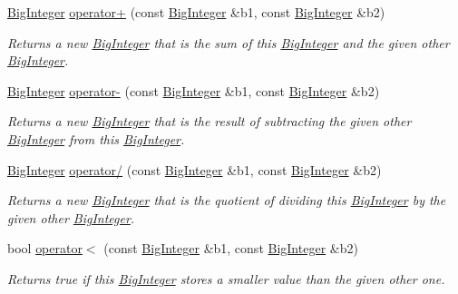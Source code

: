 \begin{DoxyCompactItemize}
\mbox{\hyperlink{classBigInteger}{Big\+Integer}} \mbox{\hyperlink{classBigInteger_a60c054a92aedb2aabf4b18d1fece1773}{operator+}} (const \mbox{\hyperlink{classBigInteger}{Big\+Integer}} \&b1, const \mbox{\hyperlink{classBigInteger}{Big\+Integer}} \&b2)
\begin{DoxyCompactList}\small\item\em Returns a new \mbox{\hyperlink{classBigInteger}{Big\+Integer}} that is the sum of this \mbox{\hyperlink{classBigInteger}{Big\+Integer}} and the given other \mbox{\hyperlink{classBigInteger}{Big\+Integer}}. \end{DoxyCompactList}\item 
\mbox{\hyperlink{classBigInteger}{Big\+Integer}} \mbox{\hyperlink{classBigInteger_ade6e91641d142240dc488b015c75504e}{operator-\/}} (const \mbox{\hyperlink{classBigInteger}{Big\+Integer}} \&b1, const \mbox{\hyperlink{classBigInteger}{Big\+Integer}} \&b2)
\begin{DoxyCompactList}\small\item\em Returns a new \mbox{\hyperlink{classBigInteger}{Big\+Integer}} that is the result of subtracting the given other \mbox{\hyperlink{classBigInteger}{Big\+Integer}} from this \mbox{\hyperlink{classBigInteger}{Big\+Integer}}. \end{DoxyCompactList}\item 
\mbox{\hyperlink{classBigInteger}{Big\+Integer}} \mbox{\hyperlink{classBigInteger_aa472efac72a9e7c868073119accefe94}{operator/}} (const \mbox{\hyperlink{classBigInteger}{Big\+Integer}} \&b1, const \mbox{\hyperlink{classBigInteger}{Big\+Integer}} \&b2)
\begin{DoxyCompactList}\small\item\em Returns a new \mbox{\hyperlink{classBigInteger}{Big\+Integer}} that is the quotient of dividing this \mbox{\hyperlink{classBigInteger}{Big\+Integer}} by the given other \mbox{\hyperlink{classBigInteger}{Big\+Integer}}. \end{DoxyCompactList}\item 
bool \mbox{\hyperlink{classBigInteger_a4dcc8676ab598fab3e5437c55b8dfaf5}{operator$<$}} (const \mbox{\hyperlink{classBigInteger}{Big\+Integer}} \&b1, const \mbox{\hyperlink{classBigInteger}{Big\+Integer}} \&b2)
\begin{DoxyCompactList}\small\item\em Returns true if this \mbox{\hyperlink{classBigInteger}{Big\+Integer}} stores a smaller value than the given other one. \end{DoxyCompactList}\item 

\end{DoxyCompactItemize}
